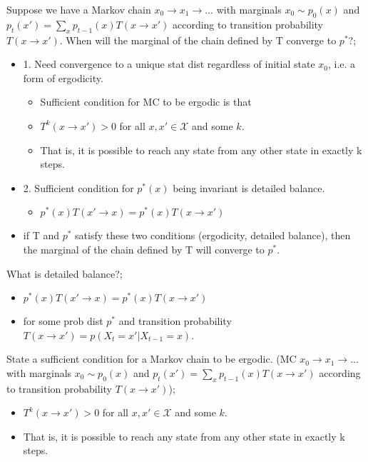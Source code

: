 \documentclass{article}
\begin{document}
Suppose we have a Markov chain $x_0 \rightarrow x_1 \rightarrow ...$ with marginals $x_0 \sim p_0(x)$ and $p_t(x') = \sum_x p_{t-1}(x)T(x\rightarrow x')$ according to transition probability $T(x\rightarrow x')$. When will the marginal of the chain defined by T converge to $p^*$?; \begin{itemize}
    \item 1. Need convergence to a unique stat dist regardless of initial state $x_0$, i.e. a form of ergodicity. \begin{itemize}
        \item Sufficient condition for MC to be ergodic is that
        \item $T^k(x\rightarrow x') > 0$ for all $x, x'\in \mathcal{X}$ and some $k$.
        \item That is, it is possible to reach any state from any other state in exactly k steps.
    \end{itemize}
    \item 2. Sufficient condition for $p^*(x)$ being invariant is detailed balance. \begin{itemize}
        \item $p^*(x)T(x'\rightarrow x) = p^*(x)T(x\rightarrow x')$
    \end{itemize}
    \item if T and $p^*$ satisfy these two conditions (ergodicity, detailed balance), then the marginal of the chain defined by T will converge to $p^*$.
\end{itemize}

What is detailed balance?; \begin{itemize}
        \item $p^*(x)T(x'\rightarrow x) = p^*(x)T(x\rightarrow x')$
        \item for some prob dist $p^*$ and transition probability $T(x\rightarrow x') = p(X_t = x'|X_{t-1}=x)$.
    \end{itemize}

State a sufficient condition for a Markov chain to be ergodic. (MC $x_0 \rightarrow x_1 \rightarrow ...$ with marginals $x_0 \sim p_0(x)$ and $p_t(x') = \sum_x p_{t-1}(x)T(x\rightarrow x')$ according to transition probability $T(x\rightarrow x')$); \begin{itemize}
        \item $T^k(x\rightarrow x') > 0$ for all $x, x'\in \mathcal{X}$ and some $k$.
        \item That is, it is possible to reach any state from any other state in exactly k steps.
    \end{itemize}
    
\end{document}
